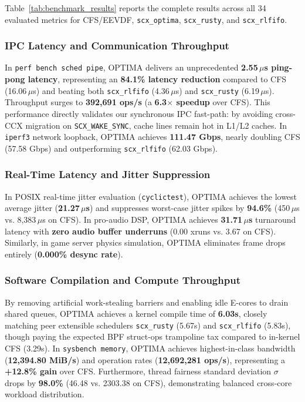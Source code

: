 \documentclass[letterpaper,twocolumn,10pt]{article}
\begin{document}
Table~\ref{tab:benchmark_results} reports the complete results across all 34 evaluated metrics for CFS/EEVDF, \texttt{scx\_optima}, \texttt{scx\_rusty}, and \texttt{scx\_rlfifo}.

\subsubsection{IPC Latency and Communication Throughput}
In \texttt{perf bench sched pipe}, OPTIMA delivers an unprecedented \textbf{2.55\,$\mu$s ping-pong latency}, representing an \textbf{84.1\% latency reduction} compared to CFS (16.06\,$\mu$s) and beating both \texttt{scx\_rlfifo} (4.36\,$\mu$s) and \texttt{scx\_rusty} (6.19\,$\mu$s). Throughput surges to \textbf{392,691 ops/s} (a \textbf{6.3$\times$ speedup} over CFS). This performance directly validates our synchronous IPC fast-path: by avoiding cross-CCX migration on \texttt{SCX\_WAKE\_SYNC}, cache lines remain hot in L1/L2 caches. In \texttt{iperf3} network loopback, OPTIMA achieves \textbf{111.47 Gbps}, nearly doubling CFS (57.58 Gbps) and outperforming \texttt{scx\_rlfifo} (62.03 Gbps).

\subsubsection{Real-Time Latency and Jitter Suppression}
In POSIX real-time jitter evaluation (\texttt{cyclictest}), OPTIMA achieves the lowest average jitter (\textbf{21.27\,$\mu$s}) and suppresses worst-case jitter spikes by \textbf{94.6\%} (450\,$\mu$s vs. 8,383\,$\mu$s on CFS). In pro-audio DSP, OPTIMA achieves \textbf{31.71\,$\mu$s} turnaround latency with \textbf{zero audio buffer underruns} (0.00 xruns vs. 3.67 on CFS). Similarly, in game server physics simulation, OPTIMA eliminates frame drops entirely (\textbf{0.000\% desync rate}).

\subsubsection{Software Compilation and Compute Throughput}
By removing artificial work-stealing barriers and enabling idle E-cores to drain shared queues, OPTIMA achieves a kernel compile time of \textbf{6.03s}, closely matching peer extensible schedulers \texttt{scx\_rusty} (5.67s) and \texttt{scx\_rlfifo} (5.83s), though paying the expected BPF struct-ops trampoline tax compared to in-kernel CFS (3.29s). In \texttt{sysbench memory}, OPTIMA achieves highest-in-class bandwidth (\textbf{12,394.80 MiB/s}) and operation rates (\textbf{12,692,281 ops/s}), representing a \textbf{+12.8\% gain} over CFS. Furthermore, thread fairness standard deviation $\sigma$ drops by \textbf{98.0\%} (46.48 vs. 2303.38 on CFS), demonstrating balanced cross-core workload distribution.
\end{document}
